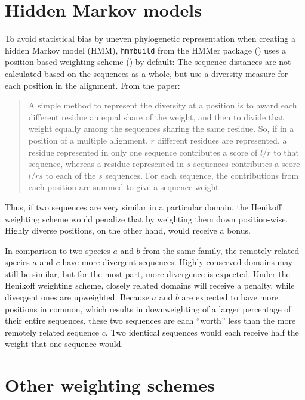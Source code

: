 \section{Hidden Markov models}

To avoid statistical bias by uneven phylogenetic representation when creating a
hidden Markov model (HMM), \texttt{hmmbuild} from the HMMer package
(\cite{Eddy2009}) uses a position-based weighting scheme (\cite{Henikoff1994})
by default: The sequence distances are not calculated based on the sequences as
a whole, but use a diversity measure for each position in the alignment. From
the paper:

\begin{quote}
	A simple method to represent the diversity at a position is to award each
	different residue an equal share of the weight, and then to divide that
	weight equally among the sequences sharing the same residue. So, if in a
	position of a multiple alignment, $r$ different residues are represented, a
	residue represented in only one sequence contributes a score of $l/r$ to that
	sequence, whereas a residue represented in $s$ sequences contributes a score
	$l/rs$ to each of the $s$ sequences. For each sequence, the contributions
	from each position are summed to give a sequence weight.
\end{quote}

Thus, if two sequences are very similar in a particular domain, the Henikoff
weighting scheme would penalize that by weighting them down position-wise.
Highly diverse positions, on the other hand, would receive a bonus. 

In comparison to two species $a$ and $b$ from the same family, the remotely
related species $a$ and $c$ have more divergent sequences. Highly conserved
domains may still be similar, but for the most part, more divergence is
expected. Under the Henikoff weighting scheme, closely related domains will
receive a penalty, while divergent ones are upweighted. Because $a$ and $b$ are
expected to have more positions in common, which results in downweighting of a
larger percentage of their entire sequences, these two sequences are each
``worth'' less than the more remotely related sequence $c$. Two identical
sequences would each receive half the weight that one sequence would.

\section*{Other weighting schemes}

